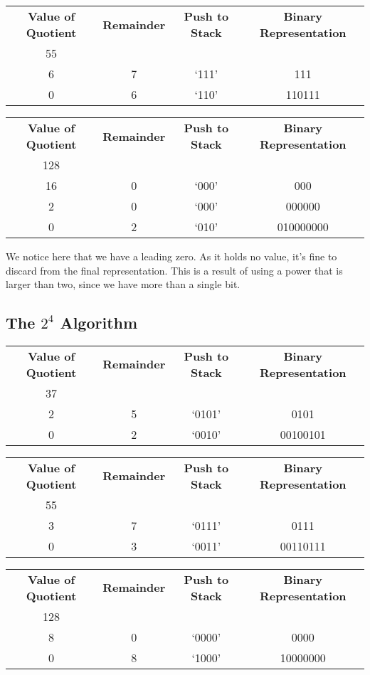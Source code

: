 \documentclass[12pt]{article}
\begin{document}
\begin{center}
  \begin{tabular}{c|c|c|c}
    \textbf{Value of Quotient} & \textbf{Remainder} & \textbf{Push to Stack} & \textbf{Binary Representation} \\
    55 &   &       & \\
    6  & 7 & `111' & 111 \\
    0  & 6 & `110' & 110111
  \end{tabular}
\end{center}

\begin{center}
  \begin{tabular}{c|c|c|c}
    \textbf{Value of Quotient} & \textbf{Remainder} & \textbf{Push to Stack} & \textbf{Binary Representation} \\
    128 &   &       & \\
    16  & 0 & `000' & 000 \\
    2   & 0 & `000' & 000000 \\
    0   & 2 & `010' & 010000000
  \end{tabular}
\end{center}
We notice here that we have a leading zero. As it holds no value, it's fine to discard from the final representation. This is a result of using a power that is larger than two, since we have more than a single bit.

\subsection{The $2^4$ Algorithm}
\begin{center}
  \begin{tabular}{c|c|c|c}
    \textbf{Value of Quotient} & \textbf{Remainder} & \textbf{Push to Stack} & \textbf{Binary Representation} \\
    37 &   &        & \\
    2  & 5 & `0101' & 0101 \\
    0  & 2 & `0010' & 00100101
  \end{tabular}
\end{center}

\begin{center}
  \begin{tabular}{c|c|c|c}
    \textbf{Value of Quotient} & \textbf{Remainder} & \textbf{Push to Stack} & \textbf{Binary Representation} \\
    55 &   &        & \\
    3  & 7 & `0111' & 0111 \\
    0  & 3 & `0011' & 00110111
  \end{tabular}
\end{center}

\begin{center}
  \begin{tabular}{c|c|c|c}
    \textbf{Value of Quotient} & \textbf{Remainder} & \textbf{Push to Stack} & \textbf{Binary Representation} \\
    128 &   &        & \\
    8   & 0 & `0000' & 0000 \\
    0   & 8 & `1000' & 10000000
  \end{tabular}
\end{center}
\end{document}
